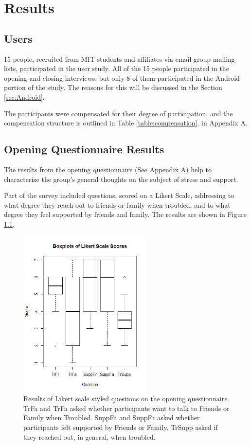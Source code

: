 \chapter{Results}
\section{Users}
  15 people, recruited from MIT students and affiliates via email group mailing
  lists, participated in the user study.
  All of the 15 people participated in the opening and closing interviews,
  but only 8 of them participated in the Android portion of the study.
  The reasons for this will be discussed in the Section \ref{sec:Android}.

  The participants were compensated for their degree of participation,
  and the compensation structure is outlined in Table \ref{table:compensation}.
  in Appendix A.

\section{Opening Questionnaire Results}
  The results from the opening questionnaire (See Appendix A)
  help to characterize the group's
  general thoughts on the subject of stress and support.
  
  Part of the survey included questions, scored on a Likert Scale,
  addressing to what degree they reach out to friends or family when troubled,
  and to what degree they feel supported by friends and family.
  The results are shown in Figure \ref{fig:likert}.

    \begin{figure}
    \centering
    \includegraphics[width=0.6\textwidth]{likert.png}
    \caption[Likert Scale Box Plots]{
      Results of Likert scale styled questions on the opening questionnaire.
      TrFa and TrFa asked whether participants want to talk to
      Friends or Family when Troubled.
      SuppFa and SuppFa asked whether participants felt supported by
      Friends or Family.
      TrSupp asked if they reached out, in general, when troubled.
    }
    \label{fig:likert}
    \end{figure}

